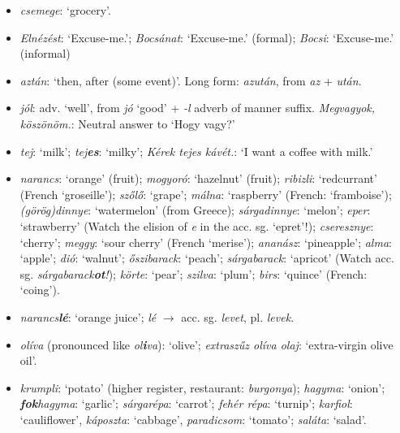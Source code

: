 \documentclass[a4paper,11pt]{article}
\begin{document}
\begin{itemize}
  \item \emph{csemege}: `grocery'.

  \item \emph{Elnézést}: `Excuse-me.'; \emph{Bocsánat}: `Excuse-me.'
    (formal); \emph{Bocsi}: `Excuse-me.' (informal)

  \item \emph{aztán}: `then, after (some event)'. Long form:
    \emph{azután}, from \emph{az} + \emph{után}.

  \item \emph{jól}: adv. `well', from \emph{jó} `good' + \emph{-l}
    adverb of manner suffix. \emph{Megvagyok, köszönöm.}: Neutral
    answer to `Hogy vagy?'

  \item \emph{tej}: `milk'; \emph{tej\textbf{es}}: `milky';
    \emph{Kérek tejes kávét.}: `I want a coffee with milk.'

  \item \emph{narancs}: `orange' (fruit); \emph{mogyoró}: `hazelnut'
    (fruit); \emph{ribizli}: `redcurrant' (French `groseille');
    \emph{szőlő}: `grape'; \emph{málna}: `raspberry' (French:
    `framboise'); \emph{(görög)dinnye}: `watermelon' (from Greece);
    \emph{sárgadinnye}: `melon'; \emph{eper}: `strawberry' (Watch the
    elision of \emph{e} in the acc. sg. `epret'!); \emph{cseresznye}:
    `cherry'; \emph{meggy}: `sour cherry' (French `merise');
    \emph{ananász}: `pineapple'; \emph{alma}: `apple'; \emph{dió}:
    `walnut'; \emph{őszibarack}: `peach'; \emph{sárgabarack}:
    `apricot' (Watch acc. sg. \emph{sárgabarack\textbf{ot}!});
    \emph{körte}: `pear'; \emph{szilva}: `plum'; \emph{birs}: `quince'
    (French: `coing').

  \item \emph{narancs\textbf{lé}}: `orange juice'; \emph{lé}
    $\rightarrow$ acc. sg. \emph{levet}, pl. \emph{levek}.

  \item \emph{olíva} (pronounced like \emph{ol\textbf{i}va}): `olive';
    \emph{extraszűz olíva olaj}: `extra-virgin olive oil'.

  \item \emph{krumpli}: `potato' (higher register, restaurant:
    \emph{burgonya}); \emph{hagyma}: `onion';
    \emph{\textbf{fok}\-ha\-gy\-ma}: `garlic'; \emph{sárgarépa}:
    `carrot'; \emph{fehér répa}: `turnip'; \emph{karfiol}:
    `cauliflower', \emph{káposzta}: `cabbage', \emph{paradicsom}:
    `tomato'; \emph{saláta}: `salad'.


\end{itemize}
\end{document}
